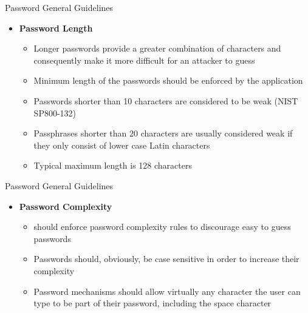 \documentclass[pdf]{beamer}
\begin{document}
\begin{frame}{Password General Guidelines}
\begin{itemize}
\item
\textbf{Password Length}
\begin{itemize}
\item
Longer passwords provide a greater combination of characters and consequently make it more difficult for an attacker to guess
\item
Minimum length of the passwords should be enforced by the application
\item
Passwords shorter than 10 characters are considered to be weak (NIST SP800-132)
\item
Passphrases shorter than 20 characters are usually considered weak if they only consist of lower case Latin characters
\item
Typical maximum length is 128 characters
\end{itemize}
\end{itemize}
\end{frame}



\begin{frame}{Password General Guidelines}
\begin{itemize}
\item
\textbf{Password Complexity}
\begin{itemize}
\item
should enforce password complexity rules to discourage easy to guess passwords
\item
Passwords should, obviously, be case sensitive in order to increase their complexity
\item
Password mechanisms should allow virtually any character the user can type to be part of their password, including the space character
\end{itemize}
\end{itemize}
\end{frame}
\end{document}
